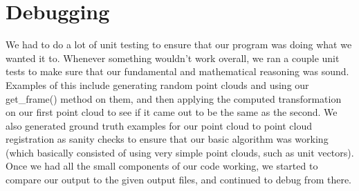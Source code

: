 \documentclass[a4paper]{article}
\begin{document}
\section{Debugging}
We had to do a lot of unit testing to ensure that our program was doing what we wanted it to. Whenever something wouldn't work overall, we ran a couple unit tests to make sure that our fundamental and mathematical reasoning was sound. Examples of this include generating random point clouds and using our get\_frame() method on them, and then applying the computed transformation on our first point cloud to see if it came out to be the same as the second.\break
We also generated ground truth examples for our point cloud to point cloud registration as sanity checks to ensure that our basic algorithm was working (which basically consisted of using very simple point clouds, such as unit vectors). Once we had all the small components of our code working, we started to compare our output to the given output files, and continued to debug from there.
\end{document}
